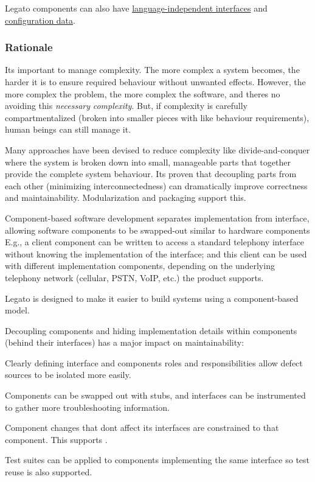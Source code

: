 Legato components can also have \hyperlink{basicInterfaces}{language-\/independent interfaces} and \hyperlink{basicConfig}{configuration data}.\hypertarget{basic_components_basicComponentsRationale}{}\subsubsection{Rationale}\label{basic_components_basicComponentsRationale}
It\textquotesingle{}s important to manage complexity. The more complex a system becomes, the harder it is to ensure required behaviour without unwanted effects. However, the more complex the problem, the more complex the software, and there\textquotesingle{}s no avoiding this {\itshape necessary} {\itshape complexity}. But, if complexity is carefully compartmentalized (broken into smaller pieces with like behaviour requirements), human beings can still manage it.

Many approaches have been devised to reduce complexity like \textquotesingle{}divide-\/and-\/conquer\textquotesingle{} where the system is broken down into small, manageable parts that together provide the complete system behaviour. It\textquotesingle{}s proven that decoupling parts from each other (minimizing interconnectedness) can dramatically improve correctness and maintainability. Modularization and packaging support this.

Component-\/based software development separates implementation from interface, allowing software components to be swapped-\/out similar to hardware components E.\+g., a client component can be written to access a standard telephony interface without knowing the implementation of the interface; and this client can be used with different implementation components, depending on the underlying telephony network (cellular, P\+S\+T\+N, Vo\+I\+P, etc.) the product supports.

Legato is designed to make it easier to build systems using a component-\/based model.

Decoupling components and hiding implementation details within components (behind their interfaces) has a major impact on maintainability\+:


\begin{DoxyItemize}
\item Clearly defining interface and components\textquotesingle{} roles and responsibilities allow defect sources to be isolated more easily.
\item Components can be swapped out with stubs, and interfaces can be instrumented to gather more troubleshooting information.
\item Component changes that don\textquotesingle{}t affect its interfaces are constrained to that component. This supports {.} 
\item Test suites can be applied to components implementing the same interface so test reuse is also supported.
\end{DoxyItemize}


